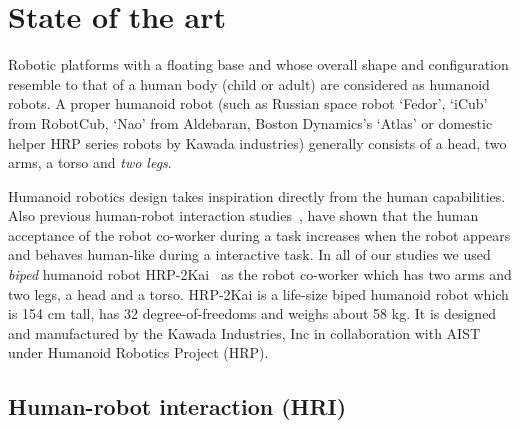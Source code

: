 
{\color{blue}\chapter{State of the art}\label{sota}}


Robotic platforms with a floating base and whose overall shape and configuration resemble to that of a human body (child or adult) are considered as humanoid robots. A proper humanoid robot (such as Russian space robot `Fedor', `iCub' from RobotCub, `Nao' from Aldebaran, Boston Dynamics's `Atlas' or domestic helper HRP series robots by Kawada industries) generally consists of a head, two arms, a torso and \textit{two legs}.

Humanoid robotics design takes inspiration directly from the human capabilities. Also previous human-robot interaction studies~\cite{huber2008human, strabala2013toward, shibata1995experimental, Chaminade:JPP:2009}, have shown that the human acceptance of the robot co-worker during a task increases when the robot appears and behaves human-like during a interactive task. In all of our studies we used \textit{biped} humanoid robot HRP-2Kai~\cite{Kaneko:RAS_ICHR:2015} as the robot co-worker which has two arms and two legs, a head and a torso. HRP-2Kai is a life-size biped humanoid robot which is 154 cm tall, has 32 degree-of-freedoms and weighs about 58 kg. It is designed and manufactured by the Kawada Industries, Inc in collaboration with AIST under Humanoid Robotics Project (HRP).


\section{Human-robot interaction (HRI)}

